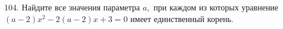 104. Найдите все значения параметра $a,$ при каждом из которых уравнение
$(a - 2)x^2 - 2(a - 2)x + 3 = 0$ имеет единственный корень.\\
